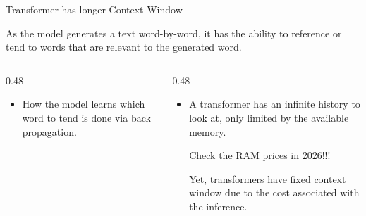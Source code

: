 \documentclass[aspectratio=169,xcolor=dvipsnames,svgnames,x11names,fleqn]{beamer}
\begin{document}
\begin{frame}[fragile]{Transformer has longer Context Window}
    
    \begin{tcolorbox}[colback=contextNavy!5, colframe=contextNavy, arc=1.5mm]
        \small
        As the model generates a text word-by-word, it has the ability to reference or tend to words that are relevant to the generated word. 
    \end{tcolorbox}

    \begin{columns}[T]
        \begin{column}{0.48\textwidth}
            \small
            \vspace{5pt}
            \begin{itemize}
                \item[\textcolor{contextTeal}{\faGraduationCap}] How the model learns which word to tend is done via back propagation.
            \end{itemize}
        \end{column}

        \begin{column}{0.48\textwidth}
            \small
            \vspace{5pt}
            \begin{itemize}
                \item[\textcolor{contextGold}{\faInfinity}] A transformer has an infinite history to look at, only limited by the available memory.
                
                \vspace{4pt}
                
                Check the RAM prices in 2026!!!

                \vspace{4pt}

Yet, transformers have fixed context window due to the cost associated with the inference.                
                
            \end{itemize}
        \end{column}
    \end{columns}

    \vspace{3pt}

    \begin{center}
\end{center}
\end{frame}
\end{document}
